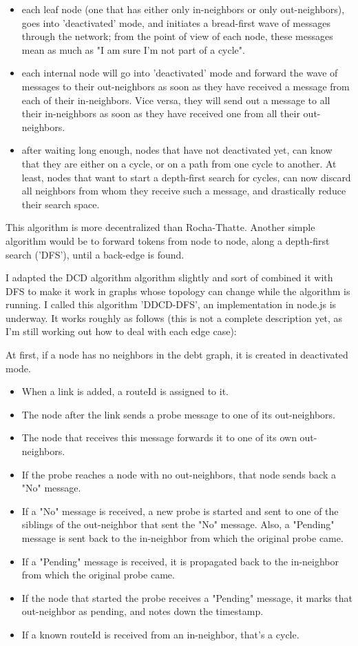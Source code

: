 \documentclass[11pt,twoside,a4paper]{article}
\begin{document}
\begin{itemize}
\item each leaf node (one that has either only in-neighbors or only out-neighbors), goes into 'deactivated' mode, and initiates a bread-first wave of messages through the network; from the point of view of each node, these messages mean as much as "I am sure I'm not part of a cycle".
\item each internal node will go into 'deactivated' mode and forward the wave of messages to their out-neighbors as soon as they have received a message from each of their in-neighbors. Vice versa, they will send out a message to all their in-neighbors as soon as they have received one from all their out-neighbors.
\item after waiting long enough, nodes that have not deactivated yet, can know that they are either on a cycle, or on a path from one cycle to another. At least, nodes that want to start a depth-first search for cycles, can now discard all neighbors from whom they receive such a message, and drastically reduce their search space.
\end{itemize}

This algorithm is more decentralized than Rocha-Thatte. Another simple algorithm would be to forward tokens from node to node, along a depth-first search ('DFS'), until a back-edge is found.

I adapted the DCD algorithm algorithm slightly and sort of combined it with DFS to make it work in graphs whose topology can change while the algorithm is running. I called this algorithm 'DDCD-DFS', an implementation in node.js is underway. It works roughly as follows (this is not a complete description yet, as I'm still working out how to deal with each edge case):

At first, if a node has no neighbors in the debt graph, it is created in deactivated mode.

\begin{itemize}
\item When a link is added, a routeId is assigned to it.
\item The node after the link sends a probe message to one of its out-neighbors.
\item The node that receives this message forwards it to one of its own out-neighbors.
\item If the probe reaches a node with no out-neighbors, that node sends back a "No" message.
\item If a "No" message is received, a new probe is started and sent to one of the siblings of the out-neighbor that sent the "No" message. Also, a "Pending" message is sent back to the in-neighbor from which the original probe came.
\item If a "Pending" message is received, it is propagated back to the in-neighbor from which the original probe came.
\item If the node that started the probe receives a "Pending" message, it marks that out-neighbor as pending, and notes down the timestamp.
\item If a known routeId is received from an in-neighbor, that's a cycle.
\end{itemize}
\end{document}

